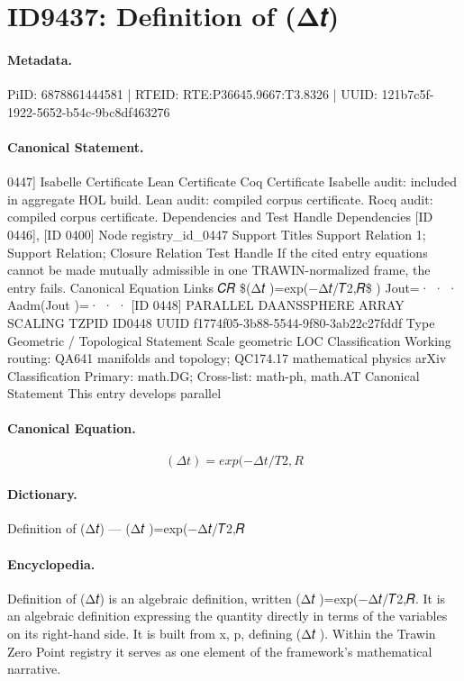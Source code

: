 \section*{ID9437: Definition of (Δ𝑡)}
\paragraph{Metadata.}
PiID: 6878861444581 | RTEID: RTE:P36645.9667:T3.8326 | UUID: 121b7c5f-1922-5652-b54c-9bc8df463276

\paragraph{Canonical Statement.}
0447] Isabelle Certificate Lean Certificate Coq Certificate Isabelle audit: included in aggregate HOL build. Lean audit: compiled corpus certificate. Rocq audit: compiled corpus certificate. Dependencies and Test Handle Dependencies [ID 0446], [ID 0400] Node registry\_id\_0447 Support Titles Support Relation 1; Support Relation; Closure Relation Test Handle If the cited entry equations cannot be made mutually admissible in one TRAWIN-normalized frame, the entry fails. Canonical Equation Links 𝐶𝑅 \$(Δ𝑡 )=exp(−Δ𝑡/𝑇2,𝑅\$ ) Jout=· · · Aadm(Jout )=· · · [ID 0448] PARALLEL DAANSSPHERE ARRAY SCALING TZPID ID0448 UUID f1774f05-3b88-5544-9f80-3ab22c27fddf Type Geometric / Topological Statement Scale geometric LOC Classification Working routing: QA641 manifolds and topology; QC174.17 mathematical physics arXiv Classification Primary: math.DG; Cross-list: math-ph, math.AT Canonical Statement This entry develops parallel

\paragraph{Canonical Equation.}
\[
(Δ𝑡 )=exp(−Δ𝑡/𝑇2,𝑅
\]

\paragraph{Dictionary.}
Definition of (Δ𝑡) — (Δ𝑡 )=exp(−Δ𝑡/𝑇2,𝑅

\paragraph{Encyclopedia.}
Definition of (Δ𝑡) is an algebraic definition, written (Δ𝑡 )=exp(−Δ𝑡/𝑇2,𝑅. It is an algebraic definition expressing the quantity directly in terms of the variables on its right-hand side. It is built from x, p, defining (Δ𝑡 ). Within the Trawin Zero Point registry it serves as one element of the framework's mathematical narrative.
